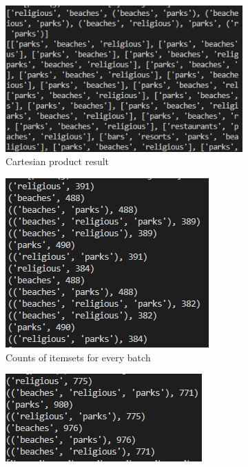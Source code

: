 \documentclass[a4paper]{article}
\begin{document}
	\begin{figure}[h]
		\centering
		
		\begin{subfigure}[b]{0.3\textwidth}
			\centering
			\includegraphics[width=\textwidth]{cartesian.PNG}
         	\caption{Cartesian product result}
         	\label{fig:cartesian}
		\end{subfigure}
		\hfill
		\begin{subfigure}[b]{0.3\textwidth}
			\centering
			\includegraphics[width=\textwidth]{counts.PNG}
         	\caption{Counts of itemsets for every batch}
         	\label{fig:counts}
		\end{subfigure}
		\hfill
		\begin{subfigure}[b]{0.3\textwidth}
			\centering
			\includegraphics[width=\textwidth]{totals.PNG}

\end{subfigure}
\end{figure}
\end{document}
